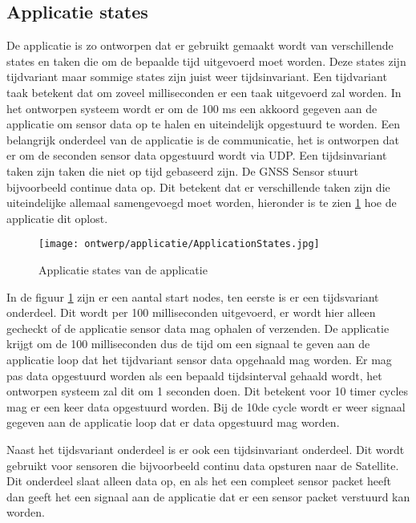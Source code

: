 \subsection{Applicatie states}
De applicatie is zo ontworpen dat er gebruikt gemaakt wordt van verschillende states en taken die om de bepaalde tijd uitgevoerd moet worden. Deze states zijn tijdvariant maar sommige states zijn juist weer tijdsinvariant. Een tijdvariant taak  betekent dat om zoveel milliseconden er een taak uitgevoerd zal worden. In het ontworpen systeem wordt er om de 100 ms een akkoord gegeven aan de applicatie om sensor data op te halen en uiteindelijk opgestuurd te worden. Een belangrijk onderdeel van de applicatie is de communicatie, het is ontworpen dat er om de seconden sensor data opgestuurd wordt via UDP. Een tijdsinvariant taken zijn taken die niet op tijd gebaseerd zijn. De GNSS Sensor stuurt bijvoorbeeld continue data op. Dit betekent dat er verschillende taken zijn die uiteindelijke allemaal samengevoegd moet worden, hieronder is te zien \ref{fig:appstates} hoe de applicatie dit oplost. \newline

\begin{figure}[h!]
	\centering
	\label{fig:appstates}

	\texttt{[image: ontwerp/applicatie/ApplicationStates.jpg]}
	\caption{Applicatie states van de applicatie}
\end{figure}

\noindent In de figuur \ref{fig:appstates} zijn er een aantal start nodes, ten eerste is er een tijdsvariant onderdeel. Dit wordt per 100 milliseconden uitgevoerd, er wordt hier alleen gecheckt of de applicatie sensor data mag ophalen of verzenden. De applicatie krijgt om de 100 milliseconden dus de tijd om een signaal te geven aan de applicatie loop dat het tijdvariant sensor data opgehaald mag worden. Er mag pas data opgestuurd worden als een bepaald tijdsinterval gehaald wordt, het ontworpen systeem zal dit om 1 seconden doen. Dit betekent voor 10 timer cycles mag er een keer data opgestuurd worden. Bij de 10de cycle wordt er weer signaal gegeven aan de applicatie loop dat er data opgestuurd mag worden. \newline

\noindent Naast het tijdsvariant onderdeel is er ook een tijdsinvariant onderdeel. Dit wordt gebruikt voor sensoren die bijvoorbeeld continu data opsturen naar de Satellite. Dit onderdeel slaat alleen data op, en als het een compleet sensor packet heeft dan geeft het een signaal aan de applicatie dat er een sensor packet verstuurd kan worden. \newline

